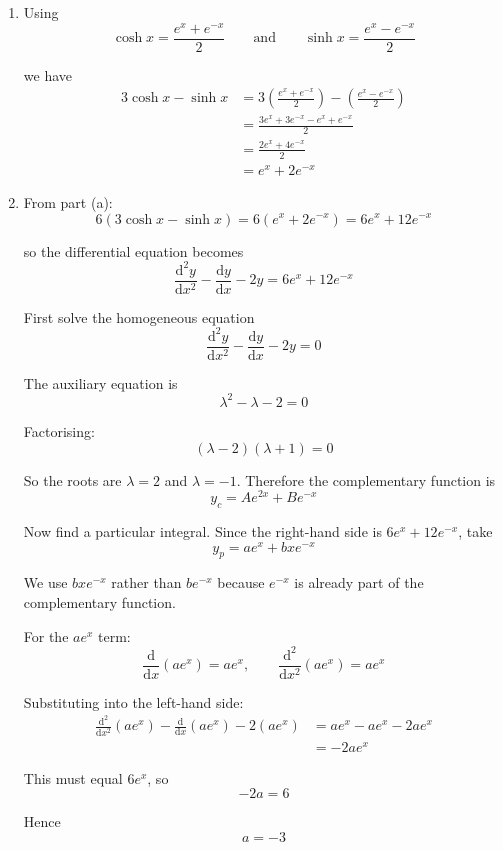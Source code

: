 \documentclass[leqno]{article}
\begin{document}
\begin{enumerate}[
  label=\textbf{\arabic*.},
  leftmargin=*,
  topsep=0pt,
  partopsep=0pt,
  parsep=0pt
]
\vspace*{10pt}

\begin{djsSolution}
\begin{enumerate}[label=\textbf{(\alph*)}]
  \item Using
\[
\cosh x=\frac{e^x+e^{-x}}{2}
\qquad\text{and}\qquad
\sinh x=\frac{e^x-e^{-x}}{2}
\]

we have
\begin{align*}
3\cosh x-\sinh x
&=3\left(\frac{e^x+e^{-x}}{2}\right)-\left(\frac{e^x-e^{-x}}{2}\right)\\
&=\frac{3e^x+3e^{-x}-e^x+e^{-x}}{2}\\
&=\frac{2e^x+4e^{-x}}{2}\\
&=e^x+2e^{-x}
\end{align*}

  \item From part (a):
\[
6(3\cosh x-\sinh x)=6(e^x+2e^{-x})=6e^x+12e^{-x}
\]

so the differential equation becomes
\[
\frac{\mathrm{d}^2 y}{\mathrm{d}x^2}-\frac{\mathrm{d}y}{\mathrm{d}x}-2y=6e^x+12e^{-x}
\]

First solve the homogeneous equation
\[
\frac{\mathrm{d}^2 y}{\mathrm{d}x^2}-\frac{\mathrm{d}y}{\mathrm{d}x}-2y=0
\]

The auxiliary equation is
\[
\lambda^2-\lambda-2=0
\]

Factorising:
\[
(\lambda-2)(\lambda+1)=0
\]

So the roots are $\lambda=2$ and $\lambda=-1$. Therefore the complementary function is
\[
y_c=Ae^{2x}+Be^{-x}
\]

Now find a particular integral. Since the right-hand side is $6e^x+12e^{-x}$, take
\[
y_p=ae^x+bxe^{-x}
\]

We use $bxe^{-x}$ rather than $be^{-x}$ because $e^{-x}$ is already part of the complementary function.

For the $ae^x$ term:
\[
\frac{\mathrm{d}}{\mathrm{d}x}(ae^x)=ae^x,
\qquad
\frac{\mathrm{d}^2}{\mathrm{d}x^2}(ae^x)=ae^x
\]

Substituting into the left-hand side:
\begin{align*}
\frac{\mathrm{d}^2}{\mathrm{d}x^2}(ae^x)-\frac{\mathrm{d}}{\mathrm{d}x}(ae^x)-2(ae^x)
&=ae^x-ae^x-2ae^x\\
&=-2ae^x
\end{align*}

This must equal $6e^x$, so
\[
-2a=6
\]

Hence
\[
a=-3
\]


\end{enumerate}
\end{djsSolution}
\end{enumerate}
\end{document}
